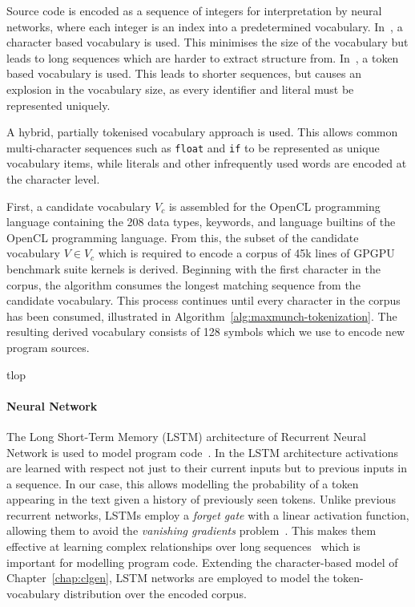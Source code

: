 Source code is encoded as a sequence of integers for interpretation by neural networks, where each integer is an index into a predetermined vocabulary. In~\cite{Jozefowicz2016a}, a character based vocabulary is used. This minimises the size of the vocabulary but leads to long sequences which are harder to extract structure from. In~\cite{Allamanis2013a}, a token based vocabulary is used. This leads to shorter sequences, but causes an explosion in the vocabulary size, as every identifier and literal must be represented uniquely.

A hybrid, partially tokenised vocabulary approach is used. This allows common multi-character sequences such as \texttt{float} and \texttt{if} to be represented as unique vocabulary items, while literals and other infrequently used words are encoded at the character level.

First, a candidate vocabulary $V_c$ is assembled for the OpenCL programming language containing the 208 data types, keywords, and language builtins of the OpenCL programming language. From this, the subset of the candidate vocabulary $V \in V_c$ which is required to encode a corpus of 45k lines of GPGPU benchmark suite kernels is derived. Beginning with the first character in the corpus, the algorithm consumes the longest matching sequence from the candidate vocabulary. This process continues until every character in the corpus has been consumed, illustrated in Algorithm~\ref{alg:maxmunch-tokenization}. The resulting derived vocabulary consists of 128 symbols which we use to encode new program sources.

\begin{algorithm}{t}{lop}
  
  \caption[Deriving a vocabulary from a string]{%
    Deriving a vocabulary from a string.%
  }
  \label{alg:maxmunch-tokenization}
\end{algorithm}

\paragraph*{Neural Network}

The Long Short-Term Memory (LSTM) architecture of Recurrent Neural Network is used to model program code~\cite{Hochreiter1997}. In the LSTM architecture activations are learned with respect not just to their current inputs but to previous inputs in a sequence. In our case, this allows modelling the probability of a token appearing in the text given a history of previously seen tokens. Unlike previous recurrent networks, LSTMs employ a \emph{forget gate} with a linear activation function, allowing them to avoid the \emph{vanishing gradients} problem~\cite{Pacanu2013}. This makes them effective at learning complex relationships over long sequences~\cite{Lipton2015} which is important for modelling program code. Extending the character-based model of Chapter~\ref{chap:clgen}, LSTM networks are employed to model the token-vocabulary distribution over the encoded corpus.

